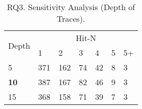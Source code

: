 \begin{table}[t]
	\caption{RQ3. Sensitivity Analysis (Depth of Traces).}
        \vspace{-9pt}
	{\footnotesize
		\begin{center}
			\renewcommand{\arraystretch}{1}
			\begin{tabular}{p{1cm}|p{0.3cm}<{\centering}|p{0.3cm}<{\centering}|p{0.3cm}<{\centering}|p{0.3cm}<{\centering}|p{0.3cm}<{\centering}|p{0.3cm}<{\centering}}
				\hline
				\multirow{2}{*}{Depth}    & \multicolumn{6}{c}{Hit-N}\\
				\cline{2-7}
				&1&2&3&4&5&5+\\
				
				\hline 
				5 			                & 371 & 162 & 74  & 42 & 8 & 3 \\
			{\bf	10}                         & 387 & 167 & 82  & 46 & 9 & 3   \\
				15	                        & 368 & 158 & 71  & 39 & 7 & 3 \\
				\hline
			\end{tabular}
			
			\label{fig:rq3-2}
		\end{center}
	}
\end{table}


